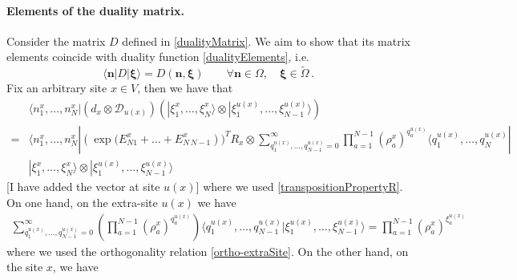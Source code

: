 \documentclass[10pt]{article}
\numberwithin{equation}{section}
\numberwithin{equation}{subsection}
\newcommand{\dd}{\mathcal{D}_{u(x)}}
\begin{document}
\paragraph{Elements of the duality matrix.}
Consider the matrix $D$ defined in \eqref{dualityMatrix}.
We aim to show that its matrix elements coincide with duality function \eqref{dualityElements}, i.e.
\begin{equation}\label{proofDualityElements}
\langle \bm{n}|D|\bm{\xi}\rangle=D(\bm{n},\bm{\xi})\qquad   \forall \bm{n}\in \Omega,\quad \bm{\xi}\in \widetilde{\Omega}\,.
\end{equation}
Fix an arbitrary site $x\in V$, then we have that 
\begin{align}
	 &\langle n^{x}_{1},\ldots,n_{N}^{x}|\left(d_{x}\otimes \dd\right)\left(|\xi_{1}^{x},\ldots,\xi_{N}^{x}\rangle\otimes|\xi_{1}^{u(x)},\ldots,\xi_{N-1}^{u(x)}\rangle\right)\nonumber\\=&\langle n_{1}^{x},\ldots,n_{N}^{x}| (\exp{(E_{N1}^{x}+\ldots+E_{N\,N-1}^{x}}))^{T}R_{x}\otimes\sum_{q_{1}^{u(x)},\ldots,q_{N-1}^{u(x)}=0}^{\infty}\prod_{a=1}^{N-1}\left(\rho_{a}^{x}\right)^{q_{a}^{u(x)}}\langle q_{1}^{u(x)},\ldots,q_{N}^{u(x)}|\nonumber
	 \\&|\xi_{1}^{x},\ldots,\xi_{N}^{x}\rangle \otimes |\xi_{1}^{u(x)},\ldots,\xi_{N-1}^{u(x)}\rangle
\end{align}
 {\color{blue} [I have added the vector at site $u(x)$]}
where we used \eqref{transpositionPropertyR}. \\
On one hand, on the extra-site $u(x)$ we have 
\begin{align}
\sum_{q_{1}^{u(x)},\ldots,q_{N-1}^{u(x)}=0}^{\infty}\left(\prod_{a=1}^{N-1}\left(\rho_{a}^{x}\right)^{q_{a}^{u(x)}}\right)\langle q_{1}^{u(x)},\ldots,q_{N-1}^{u(x)}|\xi_{1}^{u(x)},\ldots,\xi_{N-1}^{u(x)}\rangle=\prod_{a=1}^{N-1}\left(\rho_{a}^{x}\right)^{\xi_{a}^{u(x)}}
\end{align}
 {\color{blue} 
where we used the orthogonality relation \eqref{ortho-extraSite}}. 
On the other hand, on the site $x$, we have 
\end{document}
